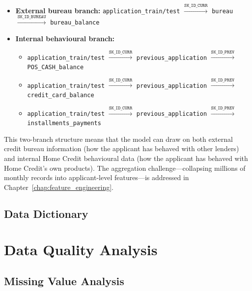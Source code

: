 \begin{itemize}
    \item \textbf{External bureau branch:} \texttt{application\_train/test} $\xrightarrow{\texttt{SK\_ID\_CURR}}$ \texttt{bureau} $\xrightarrow{\texttt{SK\_ID\_BUREAU}}$ \texttt{bureau\_balance}
    \item \textbf{Internal behavioural branch:}
    \begin{itemize}
        \item \texttt{application\_train/test} $\xrightarrow{\texttt{SK\_ID\_CURR}}$ \texttt{previous\_application} $\xrightarrow{\texttt{SK\_ID\_PREV}}$ \texttt{POS\_CASH\_balance}
        \item \texttt{application\_train/test} $\xrightarrow{\texttt{SK\_ID\_CURR}}$ \texttt{previous\_application} $\xrightarrow{\texttt{SK\_ID\_PREV}}$ \texttt{credit\_card\_balance}
        \item \texttt{application\_train/test} $\xrightarrow{\texttt{SK\_ID\_CURR}}$ \texttt{previous\_application} $\xrightarrow{\texttt{SK\_ID\_PREV}}$ \texttt{installments\_payments}
    \end{itemize}
\end{itemize}

This two-branch structure means that the model can draw on both external credit bureau information (how the applicant has behaved with other lenders) and internal Home Credit behavioural data (how the applicant has behaved with Home Credit's own products). The aggregation challenge---collapsing millions of monthly records into applicant-level features---is addressed in Chapter~\ref{chap:feature_engineering}.

\subsection{Data Dictionary}



\section{Data Quality Analysis}
\label{sec:data_quality}

\subsection{Missing Value Analysis}

